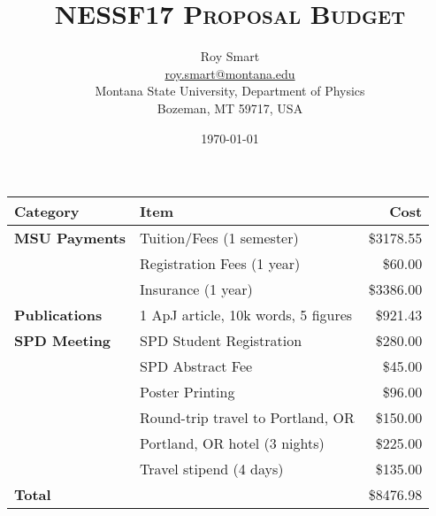 \documentclass{article}
\title{\textsc{NESSF17 Proposal Budget}}
\date{\today}
\author{Roy Smart \\ \url{roy.smart@montana.edu} \\ Montana State University, Department of Physics \\ Bozeman, MT 59717, USA}
\begin{document}
	
	\maketitle

	
	\begin{tabular}{|l | l | r|}
		\hline 
		Category & Item & Cost\\ \hline
		\textbf{MSU Payments} & Tuition/Fees (1 semester) & \$3178.55 \\ \hline
		& Registration Fees (1 year) & \$60.00 \\ \hline
		& Insurance (1 year) & \$3386.00 \\ \hline
		\textbf{Publications} & 1 ApJ article, 10k words, 5 figures & \$921.43 \\ \hline
		\textbf{SPD Meeting} & SPD Student Registration & \$280.00 \\ \hline
		& SPD Abstract Fee & \$45.00 \\ \hline
		& Poster Printing & \$96.00 \\ \hline
		& Round-trip travel to Portland, OR & \$150.00 \\ \hline
		& Portland, OR hotel (3 nights) & \$225.00 \\ \hline
		& Travel stipend (4 days) & \$135.00 \\ \hline
		\textbf{Total}& & \$8476.98 \\ \hline
	\end{tabular}
	
\end{document}
